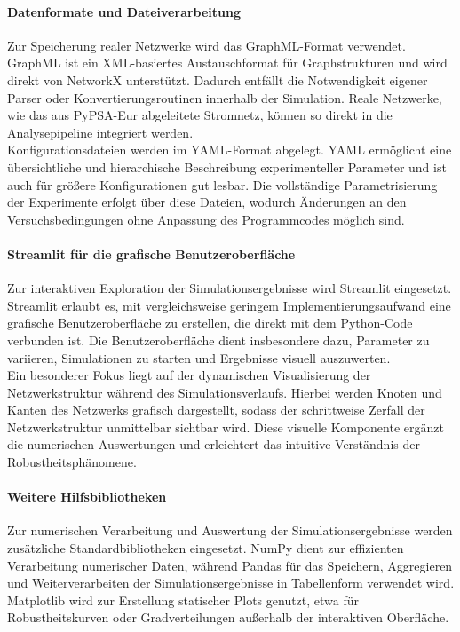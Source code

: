 \documentclass[12pt,a4paper]{article}
\begin{document}
\paragraph{Datenformate und Dateiverarbeitung}
Zur Speicherung realer Netzwerke wird das GraphML-Format verwendet. GraphML ist
ein XML-basiertes Austauschformat für Graphstrukturen und wird direkt von
NetworkX unterstützt. Dadurch entfällt die Notwendigkeit eigener Parser oder
Konvertierungsroutinen innerhalb der Simulation. Reale Netzwerke, wie das aus
PyPSA-Eur abgeleitete Stromnetz, können so direkt in die Analysepipeline
integriert werden.\\
Konfigurationsdateien werden im YAML-Format abgelegt. YAML ermöglicht eine
übersichtliche und hierarchische Beschreibung experimenteller Parameter und ist
auch für größere Konfigurationen gut lesbar. Die vollständige Parametrisierung
der Experimente erfolgt über diese Dateien, wodurch Änderungen an den
Versuchsbedingungen ohne Anpassung des Programmcodes möglich sind.

\paragraph{Streamlit für die grafische Benutzeroberfläche}
Zur interaktiven Exploration der Simulationsergebnisse wird Streamlit
eingesetzt. Streamlit erlaubt es, mit vergleichsweise geringem
Implementierungsaufwand eine grafische Benutzeroberfläche zu erstellen, die
direkt mit dem Python-Code verbunden ist. Die Benutzeroberfläche dient
insbesondere dazu, Parameter zu variieren, Simulationen zu starten und
Ergebnisse visuell auszuwerten.\\
Ein besonderer Fokus liegt auf der dynamischen Visualisierung der
Netzwerkstruktur während des Simulationsverlaufs. Hierbei werden Knoten und
Kanten des Netzwerks grafisch dargestellt, sodass der schrittweise Zerfall der
Netzwerkstruktur unmittelbar sichtbar wird. Diese visuelle Komponente ergänzt
die numerischen Auswertungen und erleichtert das intuitive Verständnis der
Robustheitsphänomene.

\paragraph{Weitere Hilfsbibliotheken}
Zur numerischen Verarbeitung und Auswertung der Simulationsergebnisse werden
zusätzliche Standardbibliotheken eingesetzt. NumPy dient zur effizienten
Verarbeitung numerischer Daten, während Pandas für das Speichern, Aggregieren
und Weiterverarbeiten der Simulationsergebnisse in Tabellenform verwendet wird.
Matplotlib wird zur Erstellung statischer Plots genutzt, etwa für
Robustheitskurven oder Gradverteilungen außerhalb der interaktiven Oberfläche.
\end{document}
